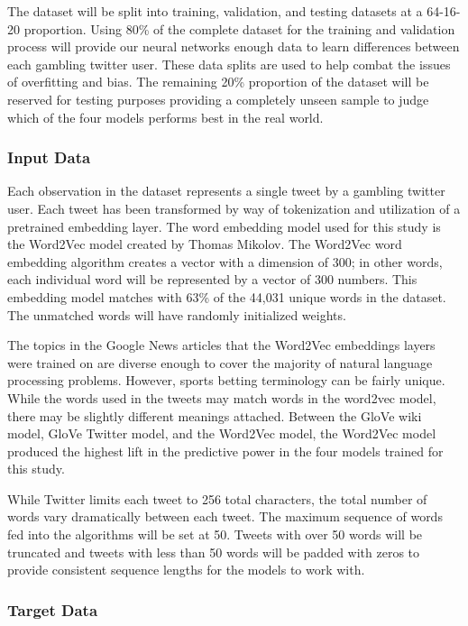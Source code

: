 \documentclass[5p,authoryear]{elsarticle}
\begin{document}
The dataset will be split into training, validation, and testing datasets at a 64-16-20 proportion. Using 80\% of the complete dataset for the training and validation process will provide our neural networks enough data to learn differences between each gambling twitter user. These data splits are used to help combat the issues of overfitting and bias. The remaining 20\% proportion of the dataset will be reserved for testing purposes providing a completely unseen sample to judge which of the four models performs best in the real world. 


\subsubsection{Input Data}

Each observation in the dataset represents a single tweet by a gambling twitter user. Each tweet has been transformed by way of tokenization and utilization of a pretrained embedding layer. The word embedding model used for this study is the Word2Vec model created by Thomas Mikolov. The Word2Vec word embedding algorithm creates a vector with a dimension of 300; in other words, each individual word will be represented by a vector of 300 numbers. This embedding model matches with 63\% of the 44,031 unique words in the dataset. The unmatched words will have randomly initialized weights.

The topics in the Google News articles that the Word2Vec embeddings layers were trained on are diverse enough to cover the majority of natural language processing problems. However, sports betting terminology can be fairly unique. While the words used in the tweets may match words in the word2vec model, there may be slightly different meanings attached. Between the GloVe wiki model, GloVe Twitter model, and the Word2Vec model, the Word2Vec model produced the highest lift in the predictive power in the four models trained for this study. 

While Twitter limits each tweet to 256 total characters, the total number of words vary dramatically between each tweet. The maximum sequence of words fed into the algorithms will be set at 50. Tweets with over 50 words will be truncated and tweets with less than 50 words will be padded with zeros to provide consistent sequence lengths for the models to work with.



\subsubsection{Target Data}
\end{document}
